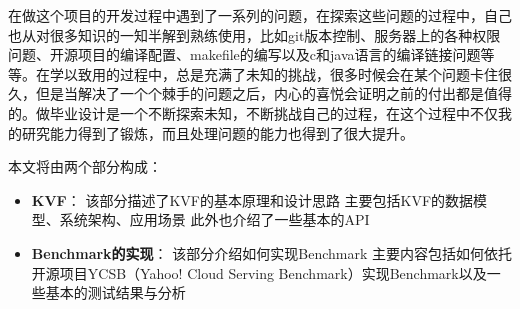 
	在做这个项目的开发过程中遇到了一系列的问题，在探索这些问题的过程中，自己也从对很多知识的一知半解到熟练使用，比如git版本控制、服务器上的各种权限问题、开源项目的编译配置、makefile的编写以及c和java语言的编译链接问题等等。在学以致用的过程中，总是充满了未知的挑战，很多时候会在某个问题卡住很久，但是当解决了一个个棘手的问题之后，内心的喜悦会证明之前的付出都是值得的。做毕业设计是一个不断探索未知，不断挑战自己的过程，在这个过程中不仅我的研究能力得到了锻炼，而且处理问题的能力也得到了很大提升。

	本文将由两个部分构成：
	\begin{itemize}
	\item \textbf{KVF}：
		该部分描述了KVF的基本原理和设计思路
		主要包括KVF的数据模型、系统架构、应用场景
		此外也介绍了一些基本的API
		
	\item \textbf{Benchmark的实现}：
		该部分介绍如何实现Benchmark
		主要内容包括如何依托开源项目YCSB（Yahoo! Cloud Serving Benchmark）实现Benchmark以及一些基本的测试结果与分析

	\end{itemize}
